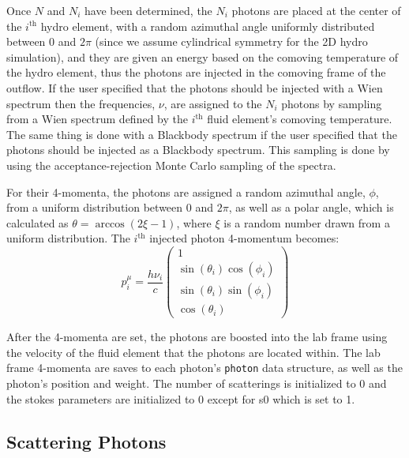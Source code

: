 \documentclass[12pt,a4paper]{article}
\begin{document}
Once $N$ and $N_i$ have been determined, the $N_i$ photons are placed at the center of the $i^\mathrm{th}$ hydro element, with a random azimuthal angle uniformly distributed between $0$ and $2\pi$ (since we assume cylindrical symmetry for the 2D hydro simulation), and they are given an energy based on the comoving temperature of the hydro element, thus the photons are injected in the comoving frame of the outflow. If the user specified that the photons should be injected with a Wien spectrum then the frequencies, $\nu$, are assigned to the $N_i$ photons by sampling from a Wien spectrum defined by the $i^\mathrm{th}$ fluid element's comoving temperature. The same thing is done with a Blackbody spectrum if the user specified that the photons should be injected as a Blackbody spectrum. This sampling is done by using the acceptance-rejection Monte Carlo sampling of the spectra.

For their 4-momenta, the photons are assigned a random azimuthal angle, $\phi$, from a uniform distribution between $0$ and $2\pi$, as well as a polar angle, which is calculated as $\theta=\arccos(2\xi-1)$, where $\xi$ is a random number drawn from a uniform distribution. The $i^\mathrm{th}$ injected photon 4-momentum becomes:
\[
p^\mu_i=\frac{h\nu_i}{c}\begin{pmatrix}
1 \\ \sin(\theta_i) \cos(\phi_i) \\ \sin(\theta_i) \sin(\phi_i) \\ \cos(\theta_i)
\end{pmatrix}
\]

After the 4-momenta are set, the photons are boosted into the lab frame using the velocity of the fluid element that the photons are located within. The lab frame 4-momenta are saves to each photon's \texttt{photon} data structure, as well as the photon's position and weight. The number of scatterings is initialized to 0 and the stokes parameters are initialized to 0 except for s0 which is set to 1.




\subsection{Scattering Photons} \label{scatt}
\end{document}
